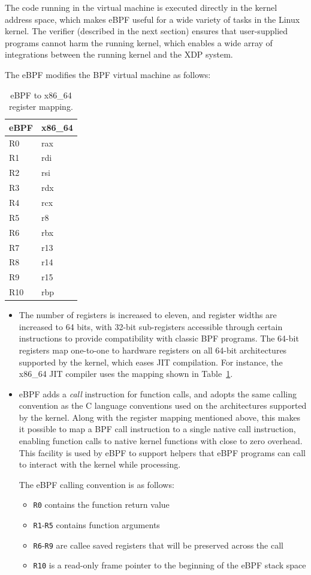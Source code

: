 \documentclass[10pt,sigconf]{acmart}
\begin{document}
The code running in the virtual machine is executed directly in the kernel
address space, which makes eBPF useful for a wide variety of tasks in the Linux
kernel. The verifier (described in the next section) ensures that user-supplied
programs cannot harm the running kernel, which enables a wide array of
integrations between the running kernel and the XDP system.

The eBPF modifies the BPF virtual machine as follows:

\begin{table}[htbp]
\caption{\label{tbl:reg-map}
eBPF to x86\_64 register mapping.}
\centering
\begin{tabular}{ll}
\toprule
eBPF & x86\_64\\
\midrule
R0 & rax\\
R1 & rdi\\
R2 & rsi\\
R3 & rdx\\
R4 & rcx\\
R5 & r8\\
R6 & rbx\\
R7 & r13\\
R8 & r14\\
R9 & r15\\
R10 & rbp\\
\bottomrule
\end{tabular}
\end{table}


\begin{itemize}
\item The number of registers is increased to eleven, and register widths are
increased to 64 bits, with 32-bit sub-registers accessible through certain
instructions to provide compatibility with classic BPF programs. The 64-bit
registers map one-to-one to hardware registers on all 64-bit architectures
supported by the kernel, which eases JIT compilation. For instance, the x86\_64
JIT compiler uses the mapping shown in Table \ref{tbl:reg-map}.

\item eBPF adds a \emph{call} instruction for function calls, and adopts the same calling
convention as the C language conventions used on the architectures supported
by the kernel. Along with the register mapping mentioned above, this makes it
possible to map a BPF call instruction to a single native call instruction,
enabling function calls to native kernel functions with close to zero
overhead. This facility is used by eBPF to support helpers that eBPF programs
can call to interact with the kernel while processing.

The eBPF calling convention is as follows:
\begin{itemize}
\item \texttt{R0} contains the function return value
\item \texttt{R1}-\texttt{R5} contains function arguments
\item \texttt{R6}-\texttt{R9} are callee saved registers that will be preserved across the call
\item \texttt{R10} is a read-only frame pointer to the beginning of the eBPF stack space
\end{itemize}
\end{itemize}
\end{document}
